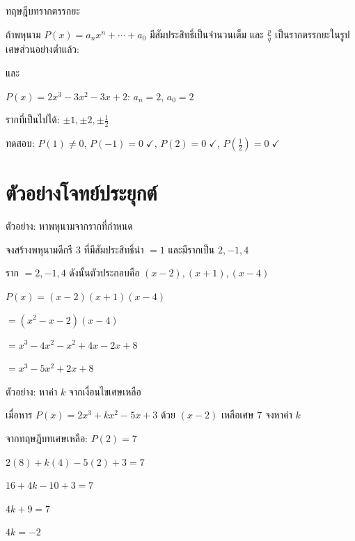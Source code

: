 \documentclass[11pt, aspectratio=169]{beamer}
\begin{document}
\begin{frame}{ทฤษฎีบทรากตรรกยะ}
  \begin{explanation}[ทฤษฎีบท]
    ถ้าพหุนาม $P(x) = a_nx^n + \cdots + a_0$ มีสัมประสิทธิ์เป็นจำนวนเต็ม
    และ $\frac{p}{q}$ เป็นรากตรรกยะในรูปเศษส่วนอย่างตํ่าแล้ว:

     \quad และ \quad {}
  \end{explanation}

  \begin{exambox}
    $P(x) = 2x^3 - 3x^2 - 3x + 2$: \quad $a_n = 2$, $a_0 = 2$

    รากที่เป็นไปได้: $\pm 1, \pm 2, \pm \frac{1}{2}$

    ทดสอบ: $P(1) \neq 0$, \quad $P(-1) = 0 \;\checkmark$, \quad $P(2) = 0 \;\checkmark$,
    \quad $P(\frac{1}{2}) = 0 \;\checkmark$

  \end{exambox}
\end{frame}

\section{ตัวอย่างโจทย์ประยุกต์}

\begin{frame}{ตัวอย่าง: หาพหุนามจากรากที่กำหนด}
  \begin{exambox}[โจทย์]
    จงสร้างพหุนามดีกรี $3$ ที่มีสัมประสิทธิ์นำ $= 1$ และมีรากเป็น $2, -1, 4$
  \end{exambox}

  \begin{solbox}[วิธีทำ]
    ราก $= 2, -1, 4$ ดังนั้นตัวประกอบคือ $(x-2), (x+1), (x-4)$

    $P(x) = (x-2)(x+1)(x-4)$

    $= (x^2 - x - 2)(x-4)$

    $= x^3 - 4x^2 - x^2 + 4x - 2x + 8$

    $= x^3 - 5x^2 + 2x + 8$
  \end{solbox}
\end{frame}

\begin{frame}{ตัวอย่าง: หาค่า $k$ จากเงื่อนไขเศษเหลือ}
  \begin{exambox}[โจทย์]
    เมื่อหาร $P(x) = 2x^3 + kx^2 - 5x + 3$ ด้วย $(x-2)$ เหลือเศษ $7$
    จงหาค่า $k$
  \end{exambox}

  \begin{solbox}[วิธีทำ]
    จากทฤษฎีบทเศษเหลือ: $P(2) = 7$

    $2(8) + k(4) - 5(2) + 3 = 7$

    $16 + 4k - 10 + 3 = 7$

    $4k + 9 = 7$

    $4k = -2$

  \end{solbox}
\end{frame}
\end{document}
